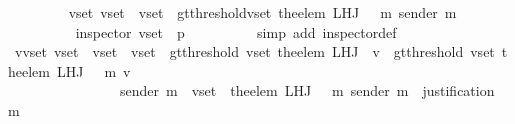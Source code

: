 \begin{isabellebody}
\ \ \ \ \ \ \isamarkupfalse%
\ {\isachardoublequoteopen}{\isasymexists}\ v{\isacharunderscore}set{\isacharprime}{\isachardot}\ v{\isacharunderscore}set{\isacharprime}\ {\isasymsubseteq}\ v{\isacharunderscore}set\ {\isasymand}\ gt{\isacharunderscore}threshold{\isacharparenleft}v{\isacharunderscore}set{\isacharprime}{\isacharcomma}\ the{\isacharunderscore}elem\ {\isacharparenleft}L{\isacharunderscore}H{\isacharunderscore}J\ {\isacharparenleft}{\isasymsigma}\ {\isasymunion}\ {\isacharbraceleft}m{\isacharbraceright}{\isacharparenright}\ {\isacharparenleft}sender\ m{\isacharparenright}{\isacharparenright}{\isacharparenright}{\isachardoublequoteclose}\isanewline
\ \ \ \ \ \ \ \ \isamarkupfalse%
\ {\isacartoucheopen}inspector\ {\isacharparenleft}v{\isacharunderscore}set{\isacharcomma}\ {\isasymsigma}{\isacharcomma}\ p{\isacharparenright}{\isacartoucheclose}\isanewline
\ \ \ \ \ \ \ \ \isamarkupfalse%
\ {\isacharparenleft}simp\ add{\isacharcolon}\ inspector{\isacharunderscore}def{\isacharparenright}\isanewline
\ \ \ \ \ \ \ \ \isamarkupfalse%
\ {\isacartoucheopen}{\isasymforall}v{\isasymin}v{\isacharunderscore}set{\isachardot}\ {\isasymforall}v{\isacharunderscore}set{\isacharprime}{\isachardot}\ \ v{\isacharunderscore}set{\isacharprime}\ {\isasymsubseteq}\ v{\isacharunderscore}set\ {\isasymand}\ gt{\isacharunderscore}threshold\ {\isacharparenleft}v{\isacharunderscore}set{\isacharprime}{\isacharcomma}\ the{\isacharunderscore}elem\ {\isacharparenleft}L{\isacharunderscore}H{\isacharunderscore}J\ {\isasymsigma}\ v{\isacharparenright}{\isacharparenright}\ {\isasymlongrightarrow}\ gt{\isacharunderscore}threshold\ {\isacharparenleft}v{\isacharunderscore}set{\isacharprime}{\isacharcomma}\ the{\isacharunderscore}elem\ {\isacharparenleft}L{\isacharunderscore}H{\isacharunderscore}J\ {\isacharparenleft}{\isasymsigma}\ {\isasymunion}\ {\isacharbraceleft}m{\isacharbraceright}{\isacharparenright}\ v{\isacharparenright}{\isacharparenright}{\isacartoucheclose}\isanewline
\ \ \ \ \ \ \ \ \ \ \ \ \ \ \ \ {\isacartoucheopen}sender\ m\ {\isasymin}\ v{\isacharunderscore}set{\isacartoucheclose}\ \ {\isacartoucheopen}the{\isacharunderscore}elem\ {\isacharparenleft}L{\isacharunderscore}H{\isacharunderscore}J\ {\isacharparenleft}{\isasymsigma}\ {\isasymunion}\ {\isacharbraceleft}m{\isacharbraceright}{\isacharparenright}\ {\isacharparenleft}sender\ m{\isacharparenright}{\isacharparenright}\ {\isacharequal}\ justification\ m{\isacartoucheclose}\isanewline
\ \ \ \ \ \ \ \ \isamarkupfalse%

\end{isabellebody}
